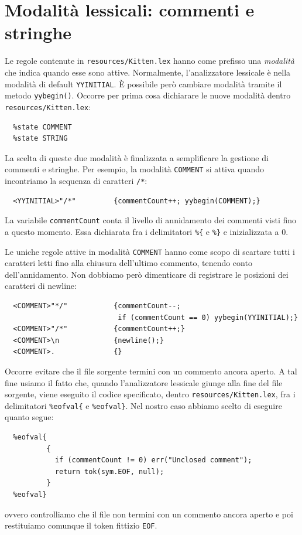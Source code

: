\section{Modalit\`a lessicali: commenti e stringhe}\label{sec:modes}
%
Le regole contenute in \texttt{resources/Kitten.lex} hanno come
prefisso una \emph{modalit\`a} che indica quando esse sono attive. Normalmente,
l'analizzatore lessicale \`e nella modalit\`a di default \texttt{YYINITIAL}.
\`E possibile per\`o cambiare modalit\`a tramite il metodo
\texttt{yybegin()}. Occorre per prima cosa dichiarare le nuove modalit\`a
dentro \texttt{resources/Kitten.lex}:
%
\begin{verbatim}
  %state COMMENT
  %state STRING
\end{verbatim}
%
La scelta di queste due modalit\`a \`e finalizzata a semplificare la
gestione di commenti e stringhe. Per esempio,
la modalit\`a \texttt{COMMENT} si attiva quando incontriamo la sequenza
di caratteri \texttt{/*}:
%
\begin{verbatim}
  <YYINITIAL>"/*"         {commentCount++; yybegin(COMMENT);}
\end{verbatim}
%
La variabile \texttt{commentCount} conta il livello di annidamento
dei commenti visti fino a questo momento. Essa \e dichiarata fra i
delimitatori \verb!%{! e \verb!%}! e inizializzata a $0$.

Le uniche regole attive in modalit\`a \texttt{COMMENT} hanno come scopo
di scartare tutti i caratteri letti fino alla chiusura dell'ultimo
commento, tenendo conto dell'annidamento. Non dobbiamo per\`o dimenticare
di registrare le posizioni dei caratteri di newline:
%
\begin{verbatim}
  <COMMENT>"*/"           {commentCount--;
                           if (commentCount == 0) yybegin(YYINITIAL);}
  <COMMENT>"/*"           {commentCount++;}
  <COMMENT>\n             {newline();}
  <COMMENT>.              {}
\end{verbatim}

Occorre evitare che il file sorgente termini con un commento
ancora aperto. A tal fine usiamo il fatto che,
quando l'analizzatore lessicale giunge alla fine del file sorgente,
viene eseguito il codice specificato, dentro \texttt{resources/Kitten.lex},
fra i delimitatori \texttt{\%eofval\{} e \texttt{\%eofval\}}. Nel nostro
caso abbiamo scelto di eseguire quanto segue:
%
\begin{verbatim}
  %eofval{
          {
            if (commentCount != 0) err("Unclosed comment");
            return tok(sym.EOF, null);
          }
  %eofval}
\end{verbatim}
%
ovvero controlliamo che il file non termini con un commento ancora aperto e
poi restituiamo comunque il token fittizio \texttt{EOF}.


